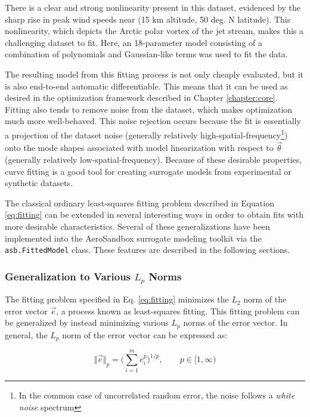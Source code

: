 There is a clear and strong nonlinearity present in this dataset, evidenced by the sharp rise in peak wind speeds near (15 km altitude, 50 deg. N latitude). This nonlinearity, which depicts the Arctic polar vortex of the jet stream, makes this a challenging dataset to fit. Here, an 18-parameter model consisting of a combination of polynomials and Gaussian-like terms was used to fit the data.

The resulting model from this fitting process is not only cheaply evaluated, but it is also end-to-end automatic differentiable. This means that it can be used as desired in the optimization framework described in Chapter \ref{chapter:core}. Fitting also tends to remove noise from the dataset, which makes optimization much more well-behaved. This noise rejection occurs because the fit is essentially a projection of the dataset noise (generally relatively high-spatial-frequency\footnote{In the common case of uncorrelated random error, the noise follows a \textit{white noise} spectrum}) onto the mode shapes associated with model linearization with respect to $\vec{\theta}$ (generally relatively low-spatial-frequency). Because of these desirable properties, curve fitting is a good tool for creating surrogate models from experimental or synthetic datasets.

The classical ordinary least-squares fitting problem described in Equation \ref{eq:fitting} can be extended in several interesting ways in order to obtain fits with more desirable characteristics. Several of these generalizations have been implemented into the AeroSandbox surrogate modeling toolkit via the \texttt{asb.FittedModel} class. These features are described in the following sections.

\subsubsection{Generalization to Various $L_p$ Norms}

The fitting problem specified in Eq. \ref{eq:fitting} minimizes the $L_2$ norm of the error vector $\vec{e}$, a process known as least-squares fitting. This fitting problem can be generalized by instead minimizing various $L_p$ norms of the error vector. In general, the $L_p$ norm of the error vector can be expressed as:

\begin{equation}
    \big\Vert \vec{e} \big\Vert _p = \bigg( \sum_{i=1}^m e_i^p \bigg)^{1/p}, \qquad p \in [1, \infty)
    \label{eq:norms}
\end{equation}

